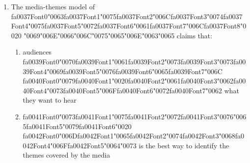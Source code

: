 \documentclass[12pt]{article}
\begin{document}
\begin{enumerate}[label=\arabic*.]
\begin{enumerate}[label=(\alph*)]
    \item both boys and girls being {\csname fa0032Font0\endcsname\char"0064}{\csname fa0032Font1\endcsname\char"0069}{\csname fa0032Font2\endcsname\char"0073}{\csname fa0032Font3\endcsname\char"0074}{\csname fa0032Font4\endcsname\char"0061} {\csname fa0033Font0\endcsname\char"006E}{\csname fa0033Font1\endcsname\char"0074}{\csname fa0033Font2\endcsname\char"0020}{\csname fa0033Font3\endcsname\char"0066}{\csname fa0033Font4\endcsname\char"0072} {\csname fa0034Font0\endcsname\char"006F}{\csname fa0034Font1\endcsname\char"006D}{\csname fa0034Font2\endcsname\char"0020}{\csname fa0034Font3\endcsname\char"0074}{\csname fa0034Font4\endcsname\char"0068} {\csname fa0035Font0\endcsname\char"0065}{\csname fa0035Font1\endcsname\char"0069}{\csname fa0035Font2\endcsname\char"0072}{\csname fa0035Font3\endcsname\char"0020}{\csname fa0035Font4\endcsname\char"0066} {\csname fa0036Font0\endcsname\char"0061}{\char"0074}{\char"0068}{\char"0065}{\char"0072}{\char"0073}, but girls breaking away
\end{enumerate}
\item The media-themes model of {\csname fa0037Font0\endcsname\char"0063}{\csname fa0037Font1\endcsname\char"0075}{\csname fa0037Font2\endcsname\char"006C}{\csname fa0037Font3\endcsname\char"0074}{\csname fa0037Font4\endcsname\char"0075}{\csname fa0037Font5\endcsname\char"0072}{\csname fa0037Font6\endcsname\char"0061}{\csname fa0037Font7\endcsname\char"006C}{\csname fa0037Font8\endcsname\char"0020} {\char"0069}{\char"006E}{\char"0066}{\char"006C}{\char"0075}{\char"0065}{\char"006E}{\char"0063}{\char"0065} claims that:
\begin{enumerate}[label=(\alph*)]
    \item audiences {\csname fa0039Font0\endcsname\char"0070}{\csname fa0039Font1\endcsname\char"0061}{\csname fa0039Font2\endcsname\char"0073}{\csname fa0039Font3\endcsname\char"0073}{\csname fa0039Font4\endcsname\char"0069}{\csname fa0039Font5\endcsname\char"0076}{\csname fa0039Font6\endcsname\char"0065}{\csname fa0039Font7\endcsname\char"006C} {\csname fa0040Font0\endcsname\char"0079}{\csname fa0040Font1\endcsname\char"0020}{\csname fa0040Font2\endcsname\char"0061}{\csname fa0040Font3\endcsname\char"0062}{\csname fa0040Font4\endcsname\char"0073}{\csname fa0040Font5\endcsname\char"006F}{\csname fa0040Font6\endcsname\char"0072}{\csname fa0040Font7\endcsname\char"0062} what they want to hear
    \item {\csname fa0041Font0\endcsname\char"0073}{\csname fa0041Font1\endcsname\char"0075}{\csname fa0041Font2\endcsname\char"0072}{\csname fa0041Font3\endcsname\char"0076}{\char"0065}{\csname fa0041Font5\endcsname\char"0079}{\csname fa0041Font6\endcsname\char"0020} {\csname fa0042Font0\endcsname\char"006D}{\csname fa0042Font1\endcsname\char"0065}{\csname fa0042Font2\endcsname\char"0074}{\csname fa0042Font3\endcsname\char"0068}{\csname fa0042Font4\endcsname\char"006F}{\csname fa0042Font5\endcsname\char"0064}{\char"0073} is the best way to identify the themes covered by the media

\end{enumerate}
\end{enumerate}
\end{document}
